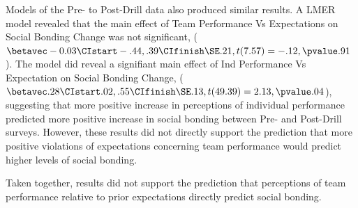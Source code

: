 \begin{CJK}{UTF8}{gbsn}
Models of the Pre- to Post-Drill data also produced similar results.  A LMER model revealed that the main effect of Team Performance Vs Expectations on Social Bonding Change was not significant, ($\betavec -0.03 \CIstart -.44, .39 \CIfinish \SE .21, t(7.57) = -.12, \pvalue .91$). The model did reveal a signifiant main effect of Ind Performance Vs Expectation on Social Bonding Change, ($\betavec .28 \CIstart .02, .55 \CIfinish \SE .13, t(49.39) = 2.13, \pvalue .04$), suggesting that more positive increase in perceptions of individual performance predicted more positive increase in social bonding between Pre- and Post-Drill surveys.  However, these results did not directly support the prediction that more positive violations of expectations concerning team performance would predict higher levels of social bonding.

Taken together, results did not support the prediction that perceptions of team performance relative to prior expectations directly predict social bonding.







\end{CJK}
